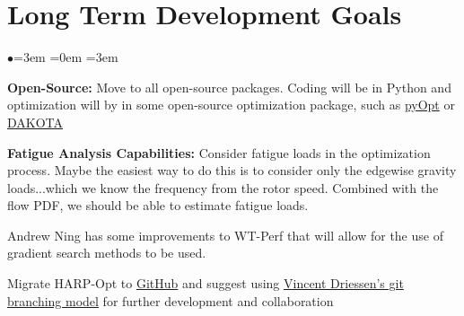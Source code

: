 \documentclass[12pt]{article}
\begin{document}
\section{Long Term Development Goals}
\begin{list}{$\bullet$}{\leftmargin=3em \itemindent=0em \rightmargin=3em}
    \item \textbf{Open-Source:} Move to all open-source packages. Coding will be in Python and optimization will by in some open-source optimization package, such as \href{http://www.pyopt.org/}{\color{blue}pyOpt} or  \href{http://dakota.sandia.gov/software.html}{\color{blue}DAKOTA}
    \item \textbf{Fatigue Analysis Capabilities:} Consider fatigue loads in the optimization process. Maybe
    the easiest way to do this is to consider only the edgewise gravity loads...which we know the frequency
    from the rotor speed.  Combined with the flow PDF, we should be able to estimate fatigue loads.
	\item Andrew Ning has some improvements to WT-Perf that will allow for the use of gradient search methods to be used.
    \item Migrate HARP-Opt to \href{https://github.com/NREL/HARP_Opt}{\color{blue}GitHub} and suggest using \href{http://nvie.com/posts/a-successful-git-branching-model/}{\color{blue}Vincent Driessen's git branching model} for further development and collaboration
    
    




\end{list}
\end{document}

